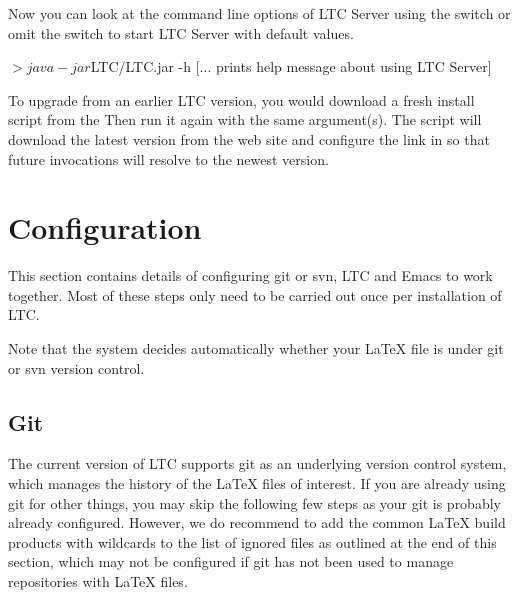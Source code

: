 
Now you can look at the command line options of LTC Server using the switch  or omit the switch to start LTC Server with default values.
\begin{CodeVerbatim}
$> java -jar $LTC/LTC.jar -h
[... prints help message about using LTC Server]
\end{CodeVerbatim}

To upgrade from an earlier LTC version, you would download a fresh install script from the  Then run it again with the same argument(s).  The script will download the latest version from the web site and configure the link in  so that future invocations  will resolve to the newest version.

\section{Configuration}

This section contains details of configuring git or svn, LTC and Emacs to work together.  Most of these steps only need to be carried out once per installation of LTC.

Note that the system decides automatically whether your LaTeX file is under git or svn version control.

\subsection{Git}

The current version of LTC supports git as an underlying version control system, which manages the history of the LaTeX files of interest. If you are already using git for other things, you may skip the following few steps as your git is probably already configured. However, we do recommend to add the common LaTeX build products with wildcards to the list of ignored files as outlined at the end of this section, which may not be configured if git has not been used to manage repositories with LaTeX files.

